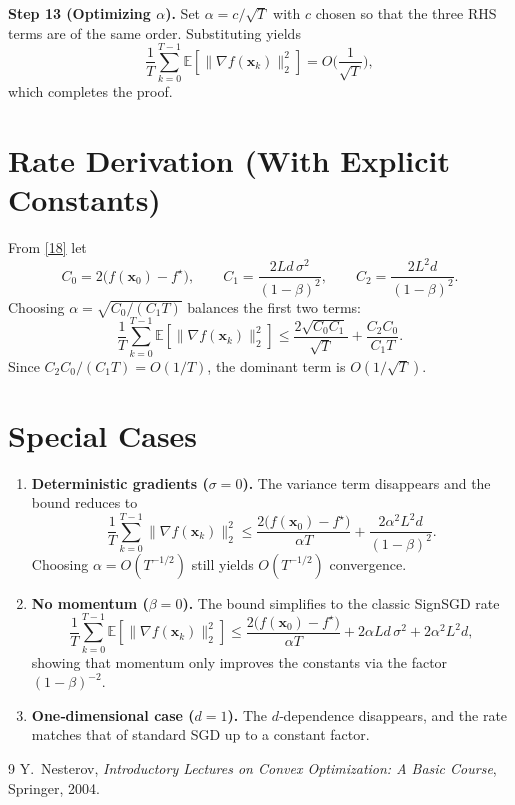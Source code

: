 \documentclass{article}
\newcommand{\E}{\mathbb{E}}
\begin{document}
\noindent\textbf{Step 13 (Optimizing $\alpha$).}  
Set $\alpha = c/\sqrt{T}$ with $c$ chosen so that the three RHS terms are of the same order. Substituting yields
\[
\frac{1}{T}\sum_{k=0}^{T-1}\E[\|\nabla f(\bm{x}_{k})\|_{2}^{2}]
= O\!\Big(\frac{1}{\sqrt{T}}\Big),
\]
which completes the proof. \qedhere

\section*{Rate Derivation (With Explicit Constants)}
From \eqref{18} let
\[
C_{0}=2\big(f(\bm{x}_{0})-f^{\star}\big),\qquad
C_{1}= \frac{2L d\,\sigma^{2}}{(1-\beta)^{2}},\qquad
C_{2}= \frac{2L^{2}d}{(1-\beta)^{2}} .
\]
Choosing $\alpha = \sqrt{C_{0}/(C_{1}T)}$ balances the first two terms:
\[
\frac{1}{T}\sum_{k=0}^{T-1}\E[\|\nabla f(\bm{x}_{k})\|_{2}^{2}]
\le
\frac{2\sqrt{C_{0}C_{1}}}{\sqrt{T}} + \frac{C_{2}C_{0}}{C_{1}T}.
\]
Since $C_{2}C_{0}/(C_{1}T)=O(1/T)$, the dominant term is $O(1/\sqrt{T})$.

\section*{Special Cases}
\begin{enumerate}
\item \textbf{Deterministic gradients ($\sigma=0$).}  
The variance term disappears and the bound reduces to
\[
\frac{1}{T}\sum_{k=0}^{T-1}\|\nabla f(\bm{x}_{k})\|_{2}^{2}
\le \frac{2\big(f(\bm{x}_{0})-f^{\star}\big)}{\alpha T}
+ \frac{2\alpha^{2}L^{2}d}{(1-\beta)^{2}}.
\]
Choosing $\alpha=O(T^{-1/2})$ still yields $O(T^{-1/2})$ convergence.

\item \textbf{No momentum ($\beta=0$).}  
The bound simplifies to the classic SignSGD rate
\[
\frac{1}{T}\sum_{k=0}^{T-1}\E[\|\nabla f(\bm{x}_{k})\|_{2}^{2}]
\le
\frac{2\big(f(\bm{x}_{0})-f^{\star}\big)}{\alpha T}
+2\alpha L d\,\sigma^{2}
+2\alpha^{2}L^{2}d,
\]
showing that momentum only improves the constants via the factor $(1-\beta)^{-2}$.

\item \textbf{One‑dimensional case ($d=1$).}  
The $d$‑dependence disappears, and the rate matches that of standard SGD up to a constant factor.
\end{enumerate}

\begin{thebibliography}{9}
Y.~Nesterov,
\textit{Introductory Lectures on Convex Optimization: A Basic Course},
Springer, 2004.
\end{thebibliography}
\end{document}
